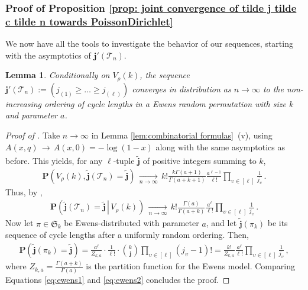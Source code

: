\documentclass{article}
\newtheorem{lemma}[theorem]{Lemma}
\theoremstyle{remark}
\newtheorem{remark}{Remark}
\newcommand{\cv}[1]{\,\underset{#1}{\longrightarrow}\,}
\newcommand{\cT}{\mathcal{T}}
\newcommand{\fS}{\mathfrak{S}}
\newcommand{\bj}{\mathbf{j}}
\newcommand{\wbj}{\widetilde{\bj}}
\newcommand{\prob}[1]{\mathbf{P}{\left(#1\right)}}
\newcommand{\probcond}[2]{\mathbf{P}{\left(\left. #1 \,\right|\, #2 \right)}}
\begin{document}
\subsubsection{Proof of Proposition \ref{prop: joint convergence of tilde j tilde c tilde n towards PoissonDirichlet}}

We now have all the tools to investigate the behavior of our sequences, starting with the asymptotics of $\bj'(\cT_n)$.

\begin{lemma}\label{lem: asymptotic distribution tilde j Ewens}
    Conditionally on $V_\rho(k)$, the sequence $\bj'(\cT_n) := (j_{(1)}\ge \dots\ge j_{(\ell)})$ 
    converges in distribution as $n\to\infty$ to the non-increasing ordering of 
    cycle lengths in a Ewens random permutation with size $k$ and parameter $a$.
\end{lemma}


\begin{proof}[Proof of ]
    Take $n\to\infty$ in Lemma \ref{lem:combinatorial formulas}~(v), using $A(x,q) \cv{} A(x,0) = -\log(1-x)$ along with the same asymptotics as before.
    This yields, for any $\ell$-tuple $\wbj$ of positive integers summing to $k$,
    \begin{align*}
        \prob{V_\rho(k), \wbj(\cT_n) = \wbj}
        \cv{n\to\infty}
        k!
        \frac{ k\Gamma(a+1)}{\Gamma(a+k+1)}
        \frac{a^{\ell-1}}{\ell!}
        \prod_{\upsilon\in [\ell]} \frac{1}{j_\upsilon} \,.
    \end{align*}
    Thus, by ,
    \begin{align}
    \label{eq:ewens1}
        \probcond{ \wbj(\cT_n) = \wbj }{V_\rho(k)}
        \cv{n\to\infty}
        k!
        \frac{\Gamma(a)}{\Gamma(a+k)}
        \frac{a^{\ell}}{\ell!}
        \prod_{\upsilon\in [\ell]} \frac{1}{j_\upsilon} \,.
    \end{align}
    Now let $\pi\in\fS_k$ be Ewens-distributed with parameter $a$, and let $\wbj(\pi_k)$ be its sequence of cycle lengths after a uniformly random ordering.
    Then,
    \begin{align}
    \label{eq:ewens2}
        \prob{ \wbj(\pi_k) = \wbj }
        = \frac{a^\ell}{Z_{k,a}}
        \cdot \frac{1}{\ell!} 
        \cdot\binom{k}{\bj} \prod_{\upsilon\in[\ell]} (j_\upsilon-1)!
        = \frac{k!}{Z_{k,a}}
        \frac{a^{\ell}}{\ell!}
        \prod_{\upsilon\in [\ell]} \frac{1}{j_\upsilon} \,,
    \end{align}
    where $Z_{k,a} = \frac{\Gamma(a+k)}{\Gamma(a)}$ is the partition function for the Ewens model.
    Comparing Equations \eqref{eq:ewens1} and \eqref{eq:ewens2} concludes the proof.
\end{proof}
\end{document}
